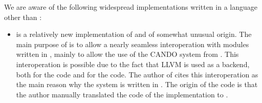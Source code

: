We are aware of the following widespread implementations written in a
language other than \commonlisp{}:

\begin{itemize}
\item \clasp{} is a relatively new implementation of \commonlisp{} and
  of somewhat unusual origin.  The main purpose of \clasp{} is to
  allow a nearly seamless interoperation with modules written in
  \cplusplus{}, mainly to allow the use of the CANDO system from
  \commonlisp{}.  This interoperation is possible due to the fact that
  LLVM is used as a backend, both for the \cplusplus{} code and for
  the \commonlisp{} code.  The author of \clasp{} cites this
  interoperation as the main reason why the system is written in
  \cplusplus{}.  The origin of the \cplusplus{} code is that the
  author manually translated the \clanguage{} code of the \ecl{}
  \commonlisp{} implementation to \cplusplus{}.
\end{itemize}
